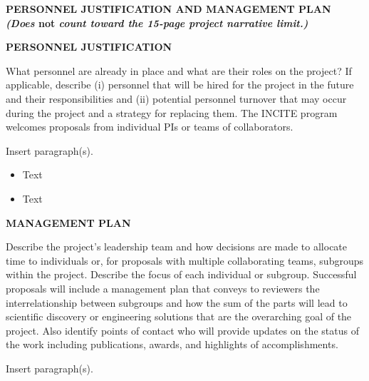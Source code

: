 \documentclass[11pt,letterpaper,english]{article}
\begin{document}
\setlength{\parindent}{0in} %


\pagestyle{fancy}   \renewcommand{%
\headrulewidth}{0.0pt}

\begin{center}
\bf {PERSONNEL JUSTIFICATION AND MANAGEMENT PLAN} \\
{\bf  {\em (Does} not {\em count toward the 15-page project narrative limit.)}}
\end{center}

\vspace{-.25in}
\begin{flushleft}
{\noindent \bf  {PERSONNEL JUSTIFICATION}}

What personnel are already in place and what are their roles on the project? If applicable, describe (i) personnel that will be hired for the project in the future and their responsibilities and (ii) potential personnel turnover that may occur during the project and a strategy for replacing them. The INCITE program welcomes proposals from individual PIs or teams of collaborators. 

Insert paragraph(s). 
\vspace{-.15in}
\begin{itemize}
\item Text\\ 
\item Text\\
\end{itemize} 

{\noindent \bf  {MANAGEMENT PLAN}}

Describe the project's leadership team and how decisions are made to allocate time to individuals or, for proposals with multiple collaborating teams, subgroups within the project. Describe the focus of each individual or subgroup. Successful proposals will include a management plan that conveys to reviewers the interrelationship between subgroups and how the sum of the parts will lead to scientific discovery or engineering solutions that are the overarching goal of the project. Also identify points of contact who will provide updates on the status of the work including publications, awards, and highlights of accomplishments.

Insert paragraph(s).
\end{flushleft}
\end{document}

